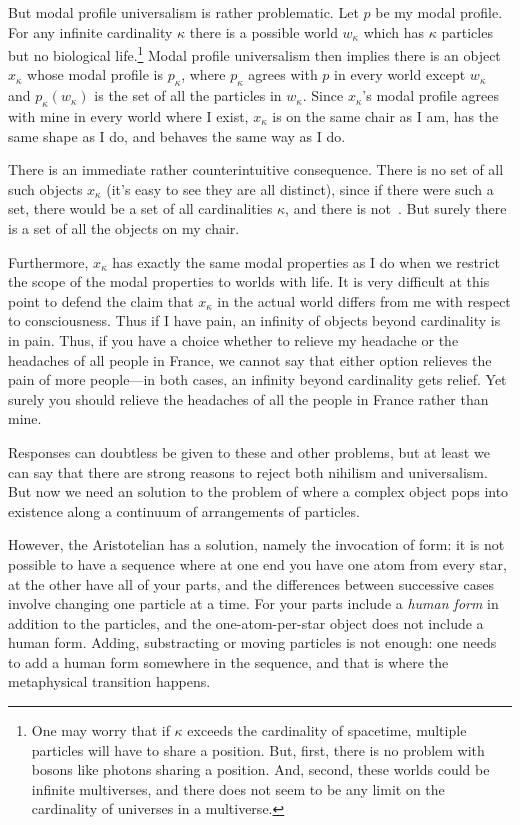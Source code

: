 But modal profile universalism is rather problematic. Let $p$ be my modal profile. For any infinite
cardinality $\kappa$ there is a possible world $w_\kappa$ which has $\kappa$ particles but no 
biological life.\footnote{One may worry that if $\kappa$ exceeds the cardinality of
spacetime, multiple particles will have to share a position. But, first, there is no problem with
bosons like photons sharing a position. And, second, these worlds could be infinite multiverses, and
there does not seem to be any limit on the cardinality of universes in a multiverse.} Modal
profile universalism then implies there is an object $x_\kappa$ whose modal profile is $p_\kappa$, where
$p_\kappa$ agrees with $p$ in every world except $w_\kappa$ and $p_\kappa(w_\kappa)$ is the set of
all the particles in $w_\kappa$. Since $x_\kappa$'s modal profile agrees with mine in every world
where I exist, $x_\kappa$ is on the same chair as I am, has the same shape as I do, and behaves the
same way as I do. 

There is an immediate rather counterintuitive consequence. There is no set of all such objects
$x_\kappa$ (it's easy to see they are all distinct), since if there were such a set, there 
would be a set of all cardinalities $\kappa$, and there is not~\parencite{PrussCardinalityObjection}. But surely 
there is a set of all the objects on my chair.

Furthermore, $x_\kappa$ has exactly the same modal properties as I do when we 
restrict the scope of the modal properties to worlds with life. It is very difficult at this point
to defend the claim that $x_\kappa$ in the actual world differs from me with respect to consciousness. 
Thus if I have pain, an infinity of objects beyond cardinality is in pain. Thus, if you have a choice
whether to relieve my headache or the headaches of all people in France, we cannot say that either option
relieves the pain of more people---in both cases, an infinity beyond cardinality gets relief. Yet
surely you should relieve the headaches of all the people in France rather than mine.

Responses can doubtless be given to these and other problems, but at least we can say that there are
strong reasons to reject both nihilism and universalism. But now we need an solution to the
problem of where a complex object pops into existence along a continuum of arrangements of
particles. 

However, the Aristotelian has a solution, namely
the invocation of form: it is not possible to have a sequence where at
one end you have one atom from every star, at the other have all of your parts,
and the differences between successive cases involve changing one particle at a time.
For your parts include a \textit{human form} in addition to the particles, and the
one-atom-per-star object does not include a human form.  Adding,
substracting or moving particles is not enough: one needs to add a human form
somewhere in the sequence, and that is where the metaphysical transition happens.

